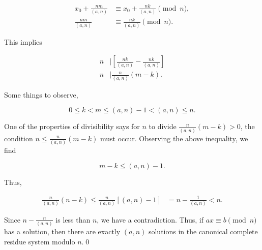 \documentclass[12pt]{article}
\begin{document}
\begin{align*}
x_0+\frac{nm}{(a,n)} &\equiv x_0+\frac{nk}{(a,n)} \pmod n,\\
\frac{nm}{(a,n)} &\equiv \frac{nk}{(a,n)} \pmod n.
\end{align*}

\noindent This implies

\begin{align*}
n &| \left[\frac{nk}{(a,n)}-\frac{nk}{(a,n)}\right]\\
n &| \frac{n}{(a,n)}(m-k).
\end{align*}

\noindent Some things to observe, 

\begin{equation*}
0\leq k < m \leq (a,n)-1 < (a,n) \leq n.
\end{equation*}

\noindent One of the properties of divisibility says for $n$ to divide $\frac{n}{(a,n)}(m-k)>0$, the condition $n\leq \frac{n}{(a,n)}(m-k)$ must occur. Observing the above inequality, we find 

\begin{equation*}
m-k \leq (a,n)-1.
\end{equation*}

\noindent Thus,

\begin{align*}
\frac{n}{(a,n)}(n-k) \leq \frac{n}{(a,n)}[(a,n)-1] &= n-\frac{1}{(a,n)} < n.
\end{align*}

\noindent Since $n-\frac{n}{(a,n)}$ is less than $n$, we have a contradiction. Thus, if $ax\equiv b\pmod n$ has a solution, then there are exactly $(a,n)$ solutions in the canonical complete residue system modulo $n$.\qed
\end{document}
